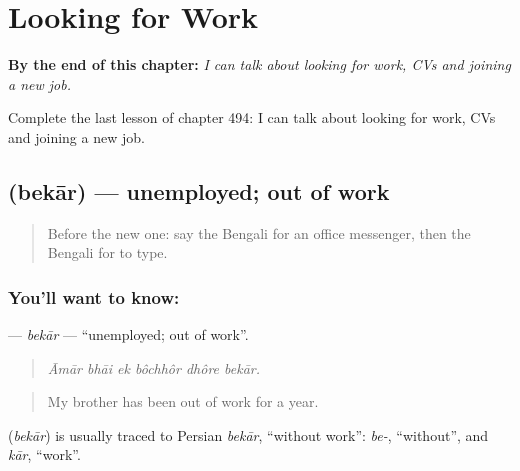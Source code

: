 
\chapter{Looking for Work}
\label{ch:bn-looking-for-work}

\begin{chapteropening}
\textbf{By the end of this chapter:} \emph{I can talk about looking for work, CVs and joining a new job.}

Complete the last lesson of chapter 494: I can talk about looking for work, CVs and joining a new job.
\end{chapteropening}

\section[\texorpdfstring{\bn{বেকার} (bekār)}{বেকার (bekār)}]{ (bekār) — unemployed; out of work}

\label{lesson:BN-C494-bekar}



\begin{quote}
Before the new one: say the Bengali for an office messenger, then the Bengali for to type.
\end{quote}

\subsection*{You'll want to know: }
\textbf{} — \emph{bekār} — \textquotedblleft{}unemployed; out of work\textquotedblright{}.

\begin{quote}
     
\end{quote}

\begin{quote}
\emph{Āmār bhāi ek bôchhôr dhôre bekār.}
\end{quote}

\begin{quote}
My brother has been out of work for a year.
\end{quote}

\begin{cousinweb}
\textbf{} (\emph{bekār}) is usually traced to Persian \emph{bekār}, \textquotedblleft{}without work\textquotedblright{}: \emph{be-}, \textquotedblleft{}without\textquotedblright{}, and \emph{kār}, \textquotedblleft{}work\textquotedblright{}.
\end{cousinweb}


